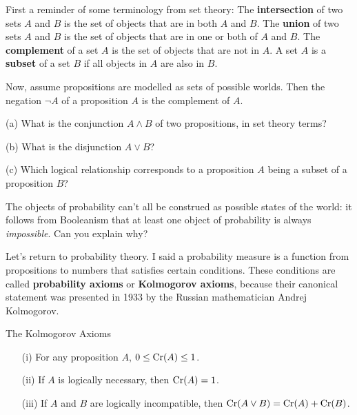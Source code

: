 \begin{exercise}{2}
  First a reminder of some terminology from set theory: 
  The \textbf{intersection} of two sets $A$ and $B$ is the set of
  objects that are in both $A$ and $B$. The \textbf{union} of two sets
  $A$ and $B$ is the set of objects that are in one or both of $A$ and
  $B$. The \textbf{complement} of a set $A$ is the set of objects that
  are not in $A$. A set $A$ is a \textbf{subset} of a set $B$ if all
  objects in $A$ are also in $B$.

  Now, assume propositions are modelled as sets of possible
  worlds. Then the negation $\neg A$ of a proposition $A$ is the
  complement of $A$.
  \begin{exlist}
  \item[(a)] What is the conjunction $A \land B$ of two propositions,
    in set theory terms?
  \item[(b)] What is the disjunction $A \lor B$?
  \item[(c)] Which logical relationship corresponds to a proposition $A$ being a
    subset of a proposition $B$?
  \end{exlist}
\end{exercise}

\begin{exercise}{2}
  The objects of probability can't all be construed as possible states
  of the world: it follows from Booleanism that at least one object of
  probability is always \emph{impossible}. Can you explain why?
\end{exercise}
  

Let's return to probability theory. I said a probability measure is a
function from propositions to numbers that satisfies certain
conditions.  These conditions are called \textbf{probability
  axioms} or \textbf{Kolmogorov axioms}, because their canonical
statement was presented in 1933 by the Russian mathematician Andrej Kolmogorov.
\begin{genericthm}{The Kolmogorov Axioms}
  \leavevmode\vspace{-2em}
  \begin{itemize}
  \itemsep0em 
  \item[(i)] For any proposition $A$, $0 \leq \text{Cr}(A) \leq 1$.
  \item[(ii)] If $A$ is logically necessary, then $\text{Cr}(A) = 1$.
  \item[(iii)] If $A$ and $B$ are logically incompatible, then $\text{Cr}(A \lor B) = \text{Cr}(A) + \text{Cr}(B)$.
  \end{itemize}
\end{genericthm}

